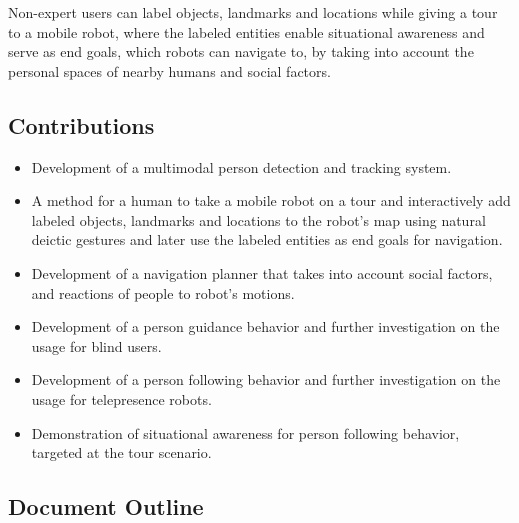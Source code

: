 \documentclass[12pt]{gatech-thesis}
\begin{document}
Non-expert users can label objects, landmarks and locations while giving a tour to a mobile robot, where the labeled entities enable situational awareness and serve as end goals, which robots can navigate to, by taking into account the personal spaces of nearby humans and social factors.


\subsection{Contributions}

\begin{itemize}
\item Development of a multimodal person detection and tracking system.
\item A method for a human to take a mobile robot on a tour and interactively add labeled objects, landmarks and locations to the robot's map using natural deictic gestures and later use the labeled entities as end goals for navigation.
\item Development of a navigation planner that takes into account social factors, and reactions of people to robot's motions.
\item Development of a person guidance behavior and further investigation on the usage for blind users.
\item Development of a person following behavior and further investigation on the usage for telepresence robots.
\item Demonstration of situational awareness for person following behavior, targeted at the tour scenario.
\end{itemize}


\subsection{Document Outline}





\end{document}
